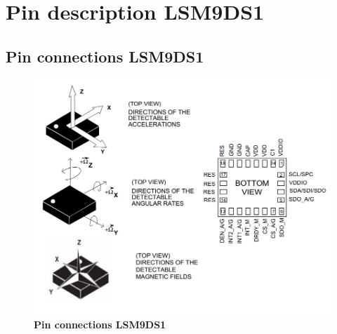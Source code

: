 %
%
%



\chapter{Pin description LSM9DS1}

\section{Pin connections LSM9DS1}

\begin{figure}[h!]
	\centering	\includegraphics[width=\linewidth]{Images/imupin}
	\caption{\textbf{Pin connections LSM9DS1}} 
\end{figure}

